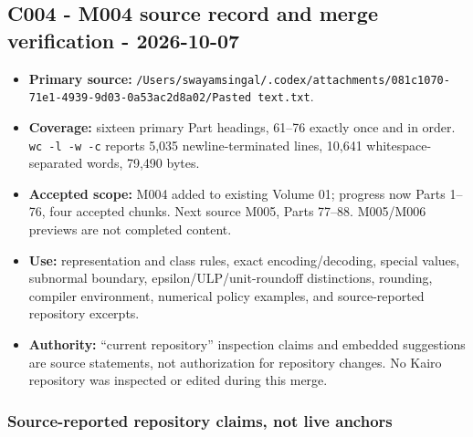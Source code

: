 \subsection{C004 - M004 source record and merge verification - 2026-10-07}\label{appendix-a103e7846d21-c004---m004-source-record-and-merge-verification---2026-10-07}

\hypertarget{appendix-a103e7846d21-c004---m004-source-record-and-merge-verification---2026-10-07}{}

\begin{itemize}
\tightlist
\item
  \textbf{Primary source:} \texttt{/Users/swayamsingal/.codex/attachments/081c1070-71e1-4939-9d03-0a53ac2d8a02/Pasted\ text.txt}.
\item
  \textbf{Coverage:} sixteen primary Part headings, 61--76 exactly once and in order. \texttt{wc\ -l\ -w\ -c} reports 5,035 newline-terminated lines, 10,641 whitespace-separated words, 79,490 bytes.
\item
  \textbf{Accepted scope:} M004 added to existing Volume 01; progress now Parts 1--76, four accepted chunks. Next source M005, Parts 77--88. M005/M006 previews are not completed content.
\item
  \textbf{Use:} representation and class rules, exact encoding/decoding, special values, subnormal boundary, epsilon/ULP/unit-roundoff distinctions, rounding, compiler environment, numerical policy examples, and source-reported repository excerpts.
\item
  \textbf{Authority:} ``current repository'' inspection claims and embedded suggestions are source statements, not authorization for repository changes. No Kairo repository was inspected or edited during this merge.
\end{itemize}

\subsubsection{Source-reported repository claims, not live anchors}\label{appendix-a103e7846d21-source-reported-repository-claims-not-live-anchors}

\hypertarget{appendix-a103e7846d21-source-reported-repository-claims-not-live-anchors}{}

